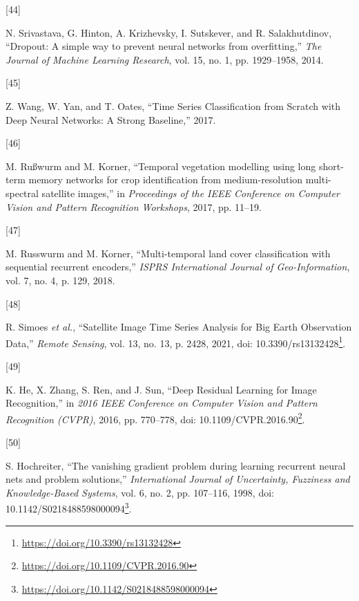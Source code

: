 \documentclass[
  11pt,
]{report}
\newlength{\cslhangindent}
\newlength{\csllabelwidth}
\newlength{\cslentryspacingunit} %
\newenvironment{CSLReferences}[2] %
 {%
  \setlength{\parindent}{0pt}
  \ifodd #1
  \let\oldpar\par
  \def\par{\hangindent=\cslhangindent\oldpar}
  \fi
  \setlength{\parskip}{#2\cslentryspacingunit}
 }%
 {}
\newcommand{\CSLLeftMargin}[1]{\parbox[t]{\csllabelwidth}{#1}}
\newcommand{\CSLRightInline}[1]{\parbox[t]{\linewidth - \csllabelwidth}{#1}\break}
\renewcommand{\href}[2]{#2\footnote{\url{#1}}}
\begin{document}
\begin{CSLReferences}{0}{0}
\leavevmode{}%
\CSLLeftMargin{{[}44{]} }%
\CSLRightInline{N. Srivastava, G. Hinton, A. Krizhevsky, I. Sutskever,
and R. Salakhutdinov, {``Dropout: {A} simple way to prevent neural
networks from overfitting,''} \emph{The Journal of Machine Learning
Research}, vol. 15, no. 1, pp. 1929--1958, 2014.}

\leavevmode{}%
\CSLLeftMargin{{[}45{]} }%
\CSLRightInline{Z. Wang, W. Yan, and T. Oates, {``Time {Series
Classification} from {Scratch} with {Deep Neural Networks}: {A Strong
Baseline},''} 2017.}

\leavevmode{}%
\CSLLeftMargin{{[}46{]} }%
\CSLRightInline{M. Rußwurm and M. Korner, {``Temporal vegetation
modelling using long short-term memory networks for crop identification
from medium-resolution multi-spectral satellite images,''} in
\emph{Proceedings of the {IEEE Conference} on {Computer Vision} and
{Pattern Recognition Workshops}}, 2017, pp. 11--19.}

\leavevmode{}%
\CSLLeftMargin{{[}47{]} }%
\CSLRightInline{M. Russwurm and M. Korner, {``Multi-temporal land cover
classification with sequential recurrent encoders,''} \emph{ISPRS
International Journal of Geo-Information}, vol. 7, no. 4, p. 129, 2018.}

\leavevmode{}%
\CSLLeftMargin{{[}48{]} }%
\CSLRightInline{R. Simoes \emph{et al.}, {``Satellite {Image Time Series
Analysis} for {Big Earth Observation Data},''} \emph{Remote Sensing},
vol. 13, no. 13, p. 2428, 2021, doi:
\href{https://doi.org/10.3390/rs13132428}{10.3390/rs13132428}.}

\leavevmode{}%
\CSLLeftMargin{{[}49{]} }%
\CSLRightInline{K. He, X. Zhang, S. Ren, and J. Sun, {``Deep {Residual
Learning} for {Image Recognition},''} in \emph{2016 {IEEE Conference} on
{Computer Vision} and {Pattern Recognition} ({CVPR})}, 2016, pp.
770--778, doi:
\href{https://doi.org/10.1109/CVPR.2016.90}{10.1109/CVPR.2016.90}.}

\leavevmode{}%
\CSLLeftMargin{{[}50{]} }%
\CSLRightInline{S. Hochreiter, {``The vanishing gradient problem during
learning recurrent neural nets and problem solutions,''}
\emph{International Journal of Uncertainty, Fuzziness and
Knowledge-Based Systems}, vol. 6, no. 2, pp. 107--116, 1998, doi:
\href{https://doi.org/10.1142/S0218488598000094}{10.1142/S0218488598000094}.}


\end{CSLReferences}
\end{document}
